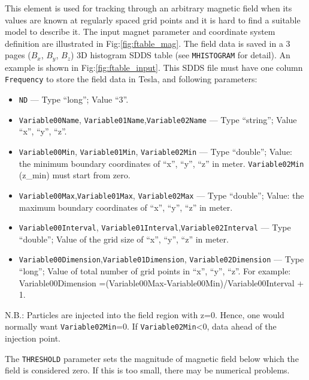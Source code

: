 This element is used for tracking through an arbitrary magnetic field
when its values are known at regularly spaced grid points and it is
hard to find a suitable model to describe it. The input magnet
parameter and coordinate system definition are illustrated in
Fig:\ref{fig:ftable_mag}. The field data is saved in a 3 pages ($B_x$,
$B_y$, $B_z$) 3D histogram SDDS table (see \verb|MHISTOGRAM| for detail).
An example is shown in Fig:\ref{fig:ftable_input}.
This SDDS file must have one column \verb|Frequency| to store the
field data in Tesla, and following parameters:

\begin{itemize} 
\item \verb|ND| --- Type ``long''; Value ``3''.
\item \verb|Variable00Name|, \verb|Variable01Name|,\verb|Variable02Name| 
      --- Type ``string''; Value ``x'', ``y'', ``z''.
\item \verb|Variable00Min|, \verb|Variable01Min|, \verb|Variable02Min|
      --- Type ``double''; Value: the minimum boundary coordinates of
      ``x'', ``y'', ``z'' in meter. \verb|Variable02Min| (z\_min) must start from zero.
\item \verb|Variable00Max|,\verb|Variable01Max|, \verb|Variable02Max| 
      --- Type ``double''; Value: the maximum boundary coordinates of 
      ``x'', ``y'', ``z'' in meter.
\item \verb|Variable00Interval|, \verb|Variable01Interval|,\verb|Variable02Interval|
      --- Type ``double''; Value of the grid size of ``x'', ``y'', ``z'' in meter.  
\item \verb|Variable00Dimension|,\verb|Variable01Dimension|, \verb|Variable02Dimension|
      --- Type ``long''; Value of total number of grid points in
      ``x'', ``y'', ``z''.  For example: Variable00Dimension
      =(Variable00Max-Variable00Min)/Variable00Interval + 1.
\end{itemize}

N.B.: Particles are injected into the field region with z=0. Hence, one would normally want
\verb|Variable02Min|=0. If \verb|Variable02Min|<0, data ahead of the injection point.

The \verb|THRESHOLD| parameter sets the magnitude of magnetic field below which the
field is considered zero. If this is too small, there may be numerical problems.

